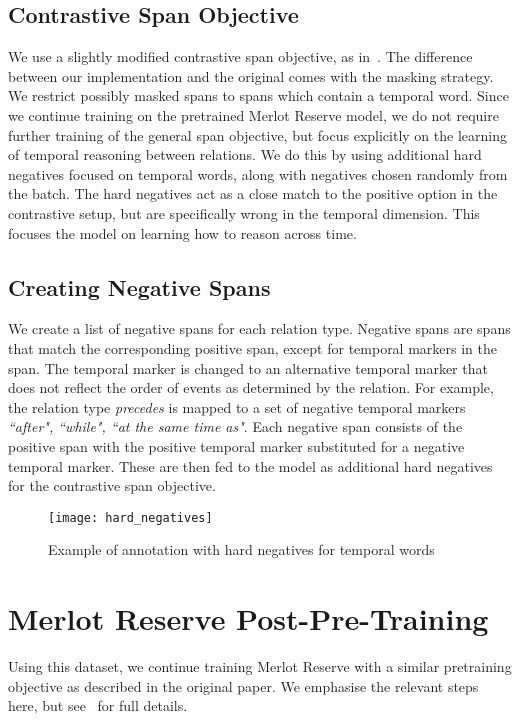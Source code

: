 \subsection{Contrastive Span Objective}
\label{ssec:contr_span}

We use a slightly modified contrastive span objective, as
in~\citet{zellers2022mreserve}. The difference between our implementation and
the original comes with the masking strategy. We restrict possibly masked spans
to spans which contain a temporal word. Since we continue training on the
pretrained Merlot Reserve model, we do not require further training of the
general span objective, but focus explicitly on the learning of temporal
reasoning between relations. We do this by using additional hard negatives
focused on temporal words, along with negatives chosen randomly from the batch.
The hard negatives act as a close match to the positive option in the
contrastive setup, but are specifically wrong in the temporal dimension. This
focuses the model on learning how to reason across time.

\subsection{Creating Negative Spans}
\label{ssec:neg_labels}

We create a list of negative spans for each relation type. Negative spans are
spans that match the corresponding positive span, except for temporal markers
in the span. The temporal marker is changed to an alternative temporal marker
that does not reflect the order of events as determined by the relation. For
example, the relation type \textit{precedes} is mapped to a set of negative
temporal markers \textit{``after", ``while", ``at the same time as"}. Each
negative span consists of the positive span with the positive temporal marker
substituted for a negative temporal marker. These are then fed to the model
as additional hard negatives for the contrastive span objective.

\begin{figure}[tp]
	\centering
	\texttt{[image: hard\_negatives]}
	\caption{Example of annotation with hard negatives for temporal words}
	\label{fig:hard_neg}
\end{figure}


\section{Merlot Reserve Post-Pre-Training}
\label{sec:training}

Using this dataset, we continue training Merlot Reserve with a similar
pretraining objective as described in the original paper. We emphasise the
relevant steps here, but see~\citet{zellers2022mreserve} for full details.
